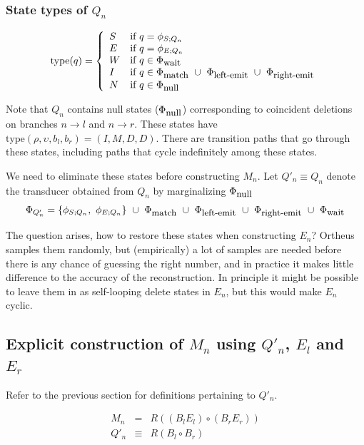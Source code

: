 \documentclass{article}
\newcommand{\seclabel}[1]{\label{sec.#1}}
\newcommand\transequiv{\equiv}
\newcommand\compose{}
\newcommand\fork{\circ}
\newcommand\States{\Phi}
\newcommand\statesof[1]{\States_{#1}}
\newcommand\startstateof[1]{\phi_{S;#1}}
\newcommand\laststateof[1]{\phi_{E;#1}}
\newcommand\statetype{\mbox{type}}
\newcommand\stateset[1]{\statesof{\mbox{\small #1}}}
\newcommand\qstate{(\rho,\upsilon,b_l,b_r)}
\newcommand\matchsuffix{match}
\newcommand\nullsuffix{null}
\newcommand\leftemitsuffix{left-emit}
\newcommand\rightemitsuffix{right-emit}
\newcommand\qwaitsuffix{wait}
\newcommand\matchstates{\stateset{\matchsuffix}}
\newcommand\nullstates{\stateset{\nullsuffix}}
\newcommand\leftemitstates{\stateset{\leftemitsuffix}}
\newcommand\rightemitstates{\stateset{\rightemitsuffix}}
\newcommand\qwaitstates{\stateset{\qwaitsuffix}}
\begin{document}
\subsubsection{State types of $Q_n$}

\[
\statetype(q) = \left\{ \begin{array}{ll}
S & \mbox{if $q = \startstateof{Q_n}$} \\
E & \mbox{if $q = \laststateof{Q_n}$} \\
W & \mbox{if $q \in \qwaitstates$} \\
I & \mbox{if $q \in \matchstates\ \cup\ \leftemitstates\ \cup\ \rightemitstates$} \\
N & \mbox{if $q \in \nullstates$}
\end{array} \right.
\]

Note that $Q_n$ contains null states ($\nullstates$) corresponding to coincident deletions on branches $n \to l$ and $n \to r$.
These states have $\statetype\qstate=(I,M,D,D)$.
There are transition paths that go through these states, including paths that cycle indefinitely among these states.

We need to eliminate these states before constructing $M_n$.
Let $Q'_n \transequiv Q_n$ denote the transducer obtained from $Q_n$ by marginalizing $\nullstates$
\[
\statesof{Q'_n} = \{ \startstateof{Q_n},\ \laststateof{Q_n} \}\ \cup\ \matchstates\ \cup\ \leftemitstates\ \cup\ \rightemitstates\ \cup\ \qwaitstates
\]

The question arises, how to restore these states when constructing $E_n$?
Ortheus samples them randomly,
but (empirically) a lot of samples are needed before there is any chance of guessing the right number,
and in practice it makes little difference to the accuracy of the reconstruction.
In principle it might be possible to leave them in as self-looping delete states in $E_n$, but this would make $E_n$ cyclic.

\subsection{Explicit construction of $M_n$ using $Q'_n$, $E_l$ and $E_r$}
\seclabel{Mn}
Refer to the previous section for definitions pertaining to $Q'_n$.

\begin{eqnarray*}
M_n & = & R \compose ((B_l \compose E_l) \fork (B_r \compose E_r)) \\
Q'_n & \transequiv & R \compose (B_l \fork B_r)
\end{eqnarray*}
\end{document}

